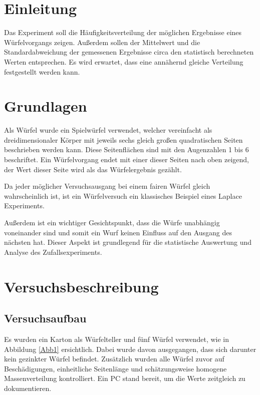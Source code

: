 \documentclass[a4paper,12pt]{article}
\begin{document}
\tableofcontents
\newpage


\section{Einleitung}
Das Experiment soll die Häufigkeitsverteilung der möglichen Ergebnisse eines Würfelvorgangs zeigen. 
Außerdem sollen der Mittelwert und die Standardabweichung der gemessenen Ergebnisse circa den statistisch 
berechneten Werten entsprechen. Es wird erwartet, dass eine annähernd gleiche Verteilung festgestellt werden kann.

\section{Grundlagen}
Als Würfel wurde ein Spielwürfel verwendet, welcher vereinfacht als dreidimensionaler Körper mit jeweils sechs gleich
großen quadratischen Seiten beschrieben werden kann. Diese Seitenflächen sind mit den Augenzahlen 1 bis 6 beschriftet. 
Ein Würfelvorgang endet mit einer dieser Seiten nach oben zeigend, der Wert dieser Seite wird als das Würfelergebnis gezählt.

Da jeder möglicher Versuchsausgang bei einem fairen Würfel gleich wahrscheinlich ist, ist ein Würfelversuch ein klassisches 
Beispiel eines Laplace Experiments.

Außerdem ist ein wichtiger Gesichtspunkt, dass die Würfe unabhängig voneinander sind und somit ein Wurf keinen Einfluss auf den 
Ausgang des nächsten hat. Dieser Aspekt ist grundlegend für die statistische Auswertung und Analyse des Zufallsexperiments.


\section{Versuchsbeschreibung}
\subsection{Versuchsaufbau}

Es wurden ein Karton als Würfelteller und fünf Würfel verwendet, wie in Abbildung \ref{Abb1} ersichtlich. Dabei wurde davon ausgegangen, 
dass sich darunter kein gezinkter Würfel befindet. Zusätzlich wurden alle Würfel zuvor auf Beschädigungen, einheitliche 
Seitenlänge und schätzungsweise homogene Massenverteilung kontrolliert. Ein PC stand bereit, um die Werte zeitgleich zu 
dokumentieren.
\end{document}
